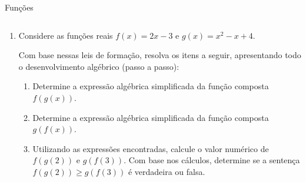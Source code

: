 \documentclass[aspectratio=169, t, 8pt]{beamer}
\newcounter{questaovest}
\newcommand{\vest}{\stepcounter{questaovest}\item[\textbf{Questão \arabic{questaovest}}:]}
\begin{document}
    \begin{frame}{Funções}
        \begin{columns}[totalwidth=.9\textwidth]
            \begin{column}{\textwidth}
                \begin{enumerate}
                    \vest Considere as funções reais $f(x) = 2x - 3$ e $g(x) = x^2 - x + 4$.

                    Com base nessas leis de formação, resolva os itens a seguir, apresentando todo o desenvolvimento algébrico (passo a passo):

                    \vspace{1.2em}

                    \begin{enumerate}
                        \item Determine a expressão algébrica simplificada da função composta $f(g(x))$. \vspace{3em}
                        \item Determine a expressão algébrica simplificada da função composta $g(f(x))$. \vspace{3em}
                        \item Utilizando as expressões encontradas, calcule o valor numérico de $f(g(2))$ e $g(f(3))$. Com base nos cálculos, determine se a sentença $f(g(2)) \geq g(f(3))$ é verdadeira ou falsa.
                    \end{enumerate}
                \end{enumerate}
            \end{column}
        \end{columns}
    \end{frame}
\end{document}
